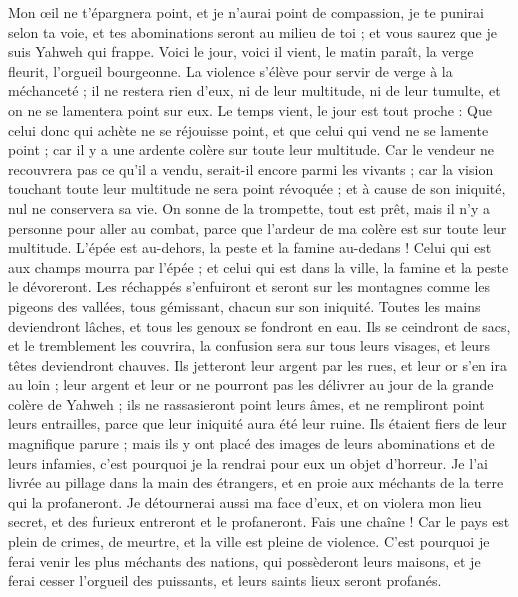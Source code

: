 \begin{multicols}{2}
Mon œil ne t'épargnera point, et je n'aurai point de compassion, je te punirai selon ta voie, et tes abominations seront au milieu de toi ; et vous saurez que je suis Yahweh qui frappe.
Voici le jour, voici il vient, le matin paraît, la verge fleurit, l’orgueil bourgeonne.
La violence s’élève pour servir de verge à la méchanceté ; il ne restera rien d'eux, ni de leur multitude, ni de leur tumulte, et on ne se lamentera point sur eux.
Le temps vient, le jour est tout proche : Que celui donc qui achète ne se réjouisse point, et que celui qui vend ne se lamente point ; car il y a une ardente colère sur toute leur multitude.
Car le vendeur ne recouvrera pas ce qu’il a vendu, serait-il encore parmi les vivants ; car la vision touchant toute leur multitude ne sera point révoquée ; et à cause de son iniquité, nul ne conservera sa vie.
On sonne de la trompette, tout est prêt, mais il n'y a personne pour aller au combat, parce que l'ardeur de ma colère est sur toute leur multitude.
L'épée est au-dehors, la peste et la famine au-dedans ! Celui qui est aux champs mourra par l'épée ; et celui qui est dans la ville, la famine et la peste le dévoreront.
Les réchappés s'enfuiront et seront sur les montagnes comme les pigeons des vallées, tous gémissant, chacun sur son iniquité.
Toutes les mains deviendront lâches, et tous les genoux se fondront en eau.
Ils se ceindront de sacs, et le tremblement les couvrira, la confusion sera sur tous leurs visages, et leurs têtes deviendront chauves.
Ils jetteront leur argent par les rues, et leur or s'en ira au loin ; leur argent et leur or ne pourront pas les délivrer au jour de la grande colère de Yahweh ; ils ne rassasieront point leurs âmes, et ne rempliront point leurs entrailles, parce que leur iniquité aura été leur ruine.
Ils étaient fiers de leur magnifique parure ; mais ils y ont placé des images de leurs abominations et de leurs infamies, c'est pourquoi je la rendrai pour eux un objet d’horreur.
Je l'ai livrée au pillage dans la main des étrangers, et en proie aux méchants de la terre qui la profaneront.
Je détournerai aussi ma face d'eux, et on violera mon lieu secret, et des furieux entreront et le profaneront.
Fais une chaîne ! Car le pays est plein de crimes, de meurtre, et la ville est pleine de violence.
C'est pourquoi je ferai venir les plus méchants des nations, qui possèderont leurs maisons, et je ferai cesser l'orgueil des puissants, et leurs saints lieux seront profanés.

\end{multicols}
